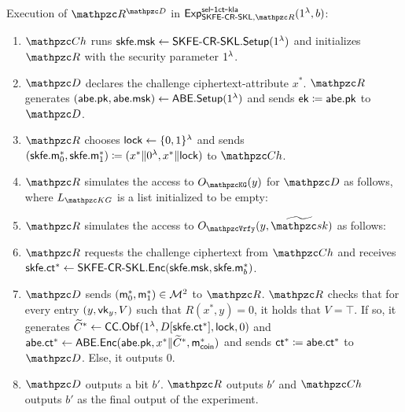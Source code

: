 \begin{description}
\item Execution of $\qR^{\qD}$ in
$\expc{\SKFESKL,\qR}{sel}{1ct}{kla}(1^\secp, b)$:

\begin{enumerate}
\item $\qCh$ runs $\mathsf{skfe}.\mathsf{msk} \leftarrow \mathsf{SKFE}\textrm{-}\mathsf{CR}\textrm{-}\mathsf{SKL}.\mathsf{Setup}(1^\lambda)$ and initializes $\qR$
with the security parameter $1^\lambda$.

\item $\qD$ declares the challenge ciphertext-attribute $x^*$. $\qR$
generates $(\mathsf{abe}.\mathsf{pk}, \mathsf{abe}.\mathsf{msk}) \leftarrow \mathsf{ABE}.\mathsf{Setup}(1^\lambda)$ and
sends $\mathsf{ek} \coloneqq \mathsf{abe}.\mathsf{pk}$ to $\qD$.

\item $\qR$ chooses $\mathsf{lock} \leftarrow \{0,1\}^{\lambda}$ and sends $(\mathsf{skfe}.\mathsf{m}_0^*,
\mathsf{skfe}.\mathsf{m}_1^*) \coloneqq (x^* \| 0^\lambda, x^* \| \mathsf{lock})$ to $\qCh$.

\item $\qR$ simulates the access to $\Oracle{\qKG}(y)$ for $\qD$ as
    follows, where $L_{\qKG}$ is a list initialized to be empty:

\item $\qR$ simulates the access to $\Oracle{\qVrfy}(y,
\widetilde{\qsk})$ as follows:
\item $\qR$ requests the challenge ciphertext from $\qCh$ and receives
$\mathsf{skfe}.\mathsf{ct}^* \leftarrow \mathsf{SKFE}\textrm{-}\mathsf{CR}\textrm{-}\mathsf{SKL}.\mathsf{Enc}(\mathsf{skfe}.\mathsf{msk}, \mathsf{skfe}.\mathsf{m}^*_b)$.
\item $\qD$ sends $(\mathsf{m}_0^*, \mathsf{m}_1^*) \in \mathcal{M}^2$ to $\qR$. $\qR$
checks that for every entry $(y,\mathsf{vk}_y,V)$ such that $R(x^*,y)=0$, it
holds that $V = \top$. If so, it
generates $\widetilde{C}^* \leftarrow \mathsf{CC}.\mathsf{Obf}(1^\lambda, D[\mathsf{skfe}.\mathsf{ct}^*], \mathsf{lock}, 0)$
and $\mathsf{abe}.\mathsf{ct}^* \leftarrow \mathsf{ABE}.\mathsf{Enc}(\mathsf{abe}.\mathsf{pk}, x^* \| \widetilde{C}^*, \mathsf{m}^*_{\mathsf{coin}})$ and
sends $\mathsf{ct}^* \coloneqq \mathsf{abe}.\mathsf{ct}^*$ to $\qD$. Else, it outputs $0$.
\item $\qD$ outputs a bit $b'$. $\qR$ outputs $b'$ and $\qCh$
outputs $b'$ as the final output of the experiment.
\end{enumerate}
\end{description}

